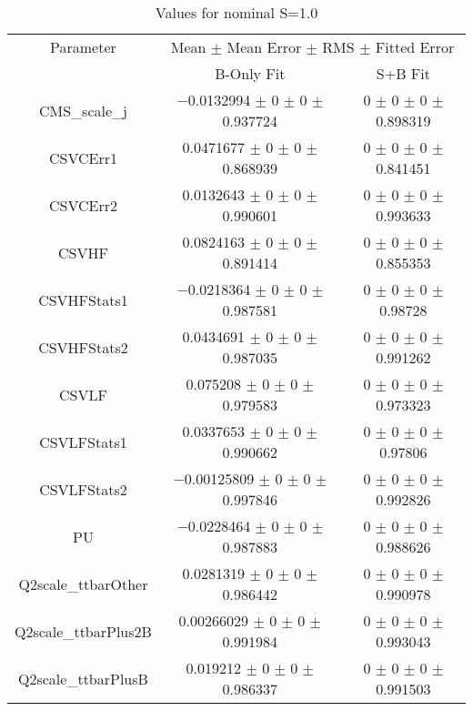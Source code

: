 \begin{table}
\centering
\caption{Values for nominal S=1.0}
\begin{tabular}{ccc}
\toprule
Parameter & \multicolumn{2}{c}{Mean $\pm$ Mean Error $\pm$ RMS $\pm$ Fitted Error}\\
 & B-Only Fit & S+B Fit\\
\midrule
CMS\_scale\_j & \num{-0.0132994} $\pm$ \num{0} $\pm$ \num{0} $\pm$ \num{0.937724} & \num{0} $\pm$ \num{0} $\pm$ \num{0} $\pm$ \num{0.898319}\\
CSVCErr1 & \num{0.0471677} $\pm$ \num{0} $\pm$ \num{0} $\pm$ \num{0.868939} & \num{0} $\pm$ \num{0} $\pm$ \num{0} $\pm$ \num{0.841451}\\
CSVCErr2 & \num{0.0132643} $\pm$ \num{0} $\pm$ \num{0} $\pm$ \num{0.990601} & \num{0} $\pm$ \num{0} $\pm$ \num{0} $\pm$ \num{0.993633}\\
CSVHF & \num{0.0824163} $\pm$ \num{0} $\pm$ \num{0} $\pm$ \num{0.891414} & \num{0} $\pm$ \num{0} $\pm$ \num{0} $\pm$ \num{0.855353}\\
CSVHFStats1 & \num{-0.0218364} $\pm$ \num{0} $\pm$ \num{0} $\pm$ \num{0.987581} & \num{0} $\pm$ \num{0} $\pm$ \num{0} $\pm$ \num{0.98728}\\
CSVHFStats2 & \num{0.0434691} $\pm$ \num{0} $\pm$ \num{0} $\pm$ \num{0.987035} & \num{0} $\pm$ \num{0} $\pm$ \num{0} $\pm$ \num{0.991262}\\
CSVLF & \num{0.075208} $\pm$ \num{0} $\pm$ \num{0} $\pm$ \num{0.979583} & \num{0} $\pm$ \num{0} $\pm$ \num{0} $\pm$ \num{0.973323}\\
CSVLFStats1 & \num{0.0337653} $\pm$ \num{0} $\pm$ \num{0} $\pm$ \num{0.990662} & \num{0} $\pm$ \num{0} $\pm$ \num{0} $\pm$ \num{0.97806}\\
CSVLFStats2 & \num{-0.00125809} $\pm$ \num{0} $\pm$ \num{0} $\pm$ \num{0.997846} & \num{0} $\pm$ \num{0} $\pm$ \num{0} $\pm$ \num{0.992826}\\
PU & \num{-0.0228464} $\pm$ \num{0} $\pm$ \num{0} $\pm$ \num{0.987883} & \num{0} $\pm$ \num{0} $\pm$ \num{0} $\pm$ \num{0.988626}\\
Q2scale\_ttbarOther & \num{0.0281319} $\pm$ \num{0} $\pm$ \num{0} $\pm$ \num{0.986442} & \num{0} $\pm$ \num{0} $\pm$ \num{0} $\pm$ \num{0.990978}\\
Q2scale\_ttbarPlus2B & \num{0.00266029} $\pm$ \num{0} $\pm$ \num{0} $\pm$ \num{0.991984} & \num{0} $\pm$ \num{0} $\pm$ \num{0} $\pm$ \num{0.993043}\\
Q2scale\_ttbarPlusB & \num{0.019212} $\pm$ \num{0} $\pm$ \num{0} $\pm$ \num{0.986337} & \num{0} $\pm$ \num{0} $\pm$ \num{0} $\pm$ \num{0.991503}\\

\end{tabular}
\end{table}

